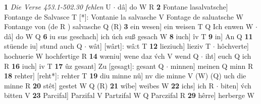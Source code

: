 \documentclass[8pt,a4paper,notitlepage]{article}
\begin{document}
\begin{table}[ht]
\begin{minipage}[t]{0.5\linewidth}
\textbf{1} \textit{Die Verse 453.1-502.30 fehlen} U   $\cdot$ dâ] do W R \textbf{2} Fontane lasalvatsche] Fontange de Salvasce T [*]: Vontanie la salvasche V Fontage de saluatsche W Fontange von (de R ) salvasche Q (R) \textbf{3} ein wesen] ein weisen T Q Ich enwen W  $\cdot$ dâ] do W Q \textbf{6} iu sus geschach] ich úch suß gesach W \textbf{8} iuch] îv T \textbf{9} in] An Q \textbf{11} stüende iu] stund auch Q  $\cdot$ wât] [wârt]: wâ:t T \textbf{12} lieziuch] lieziv T  $\cdot$ hôchverte] hochuerie W hochfertige R \textbf{14} wæniu] wene daz v́ch V wend Q  $\cdot$ iht] euch Q ich R \textbf{16} iuch] iv T \textbf{17} ûz gesant] Zu [gesagt]: gesant Q  $\cdot$ minnen] meinen Q minn R \textbf{18} rehter] [reht*]: rehter T \textbf{19} diu minne nû] nv die minne V (W) (Q) uch die minne R \textbf{20} stêt] gestet W Q (R) \textbf{21} wîbe] weibes W \textbf{22} ichs] ich R  $\cdot$ biten] v́ch bitten V \textbf{23} Parcifal] Parzifal V Partzifal W Q Parczifal R \textbf{29} hêrre] herberge W \newline
\end{minipage}
\end{table}
\end{document}
